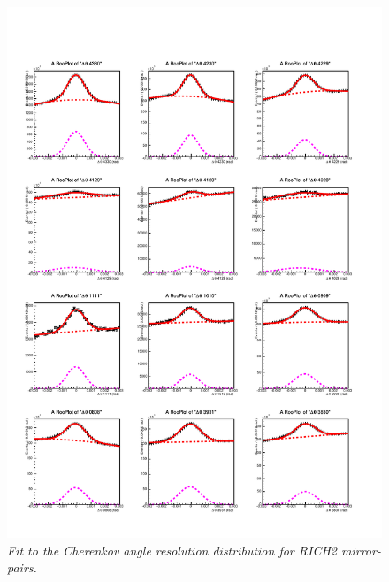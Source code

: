 \begin{figure}[!h]
	\vspace*{-0.cm}
	\begin{center}
		\includegraphics[width=1.\textwidth]{rich2_p5.pdf}
		\vspace*{-1.5cm}
	\end{center}
	\caption{\textit{Fit to the Cherenkov angle resolution distribution for RICH2 mirror-pairs.}}
	\label{fig:rich2p5}
\end{figure}
\clearpage
